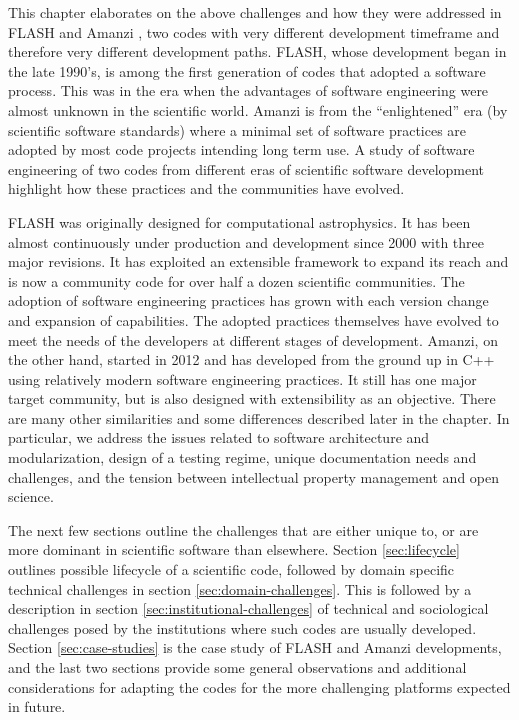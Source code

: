 This chapter elaborates on the above challenges and how they were
addressed in FLASH \cite{Dubey2009, Fryxell2000} and Amanzi \cite{moulton2011}, two codes with very  
different development timeframe and therefore very different
development paths. FLASH, whose development began in the late 1990's,
is among the first generation of codes that
adopted a software process. This was in the era when the advantages of
software engineering were almost unknown in the scientific
world. Amanzi is from the ``enlightened'' era (by scientific software
standards) where a minimal set of software practices are adopted by
most code projects intending long term use. A study of software
engineering of two codes from different eras of scientific software
development highlight how these practices  and the communities have
evolved.    

FLASH was originally designed for computational
astrophysics. It has been almost continuously 
under production and development since 2000 with three major
revisions. It has exploited an extensible framework to expand its
reach and is now a community code for over half a dozen scientific
communities. The adoption of software engineering practices has
grown with each version change and expansion of capabilities. The
adopted practices themselves have evolved to meet the needs of the
developers at different stages of development. Amanzi, on the other
hand, started in 2012 and has developed 
from the ground up in C++ using relatively modern software engineering
practices. It still has one major target community, but is also
designed with extensibility as an objective. There are many other
similarities and some differences described later in the chapter.
In particular, we address the issues related to software
architecture and modularization, design of a testing regime,
unique documentation needs and challenges, and the tension between intellectual property
management and open science.

The next few sections outline the challenges that  
are either unique to, or are more dominant in scientific
software than elsewhere. Section \ref{sec:lifecycle} outlines possible
lifecycle of a scientific code, followed by domain specific
technical challenges in section \ref{sec:domain-challenges}. This is
followed by a description in section \ref{sec:institutional-challenges}
of technical and sociological challenges posed by the institutions
where such codes are usually developed. Section
\ref{sec:case-studies} is the case study of FLASH and Amanzi
developments, and the last two sections provide some general
observations and additional considerations for adapting the
codes for the more challenging platforms expected in future.
